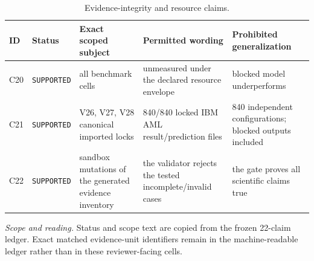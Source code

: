 \begin{table}[tbp]
\centering
\footnotesize
\setlength{\tabcolsep}{3.2pt}
\renewcommand{\arraystretch}{1.12}
\caption{Evidence-integrity and resource claims.}
\label{tab:s-claims-integrity}
\begin{tabularx}{\textwidth}{@{}l >{\raggedright\arraybackslash}p{} Y Y Y@{}}
\toprule
\textbf{ID} & \textbf{Status} & \textbf{Exact scoped subject} & \textbf{Permitted wording} & \textbf{Prohibited generalization} \\
\midrule
C20 & \texttt{SUPPORTED} & all benchmark cells & unmeasured under the declared resource envelope & blocked model underperforms \\
C21 & \texttt{SUPPORTED} & V26, V27, V28 canonical imported locks & 840/840 locked IBM AML result/prediction files & 840 independent configurations; blocked outputs included \\
C22 & \texttt{SUPPORTED} & sandbox mutations of the generated evidence inventory & the validator rejects the tested incomplete/invalid cases & the gate proves all scientific claims true \\
\bottomrule
\end{tabularx}
\vspace{2pt}
\begin{minipage}{\textwidth}\footnotesize\emph{Scope and reading.} Status and scope text are copied from the frozen 22-claim ledger. Exact matched evidence-unit identifiers remain in the machine-readable ledger rather than in these reviewer-facing cells.\end{minipage}
\end{table}
